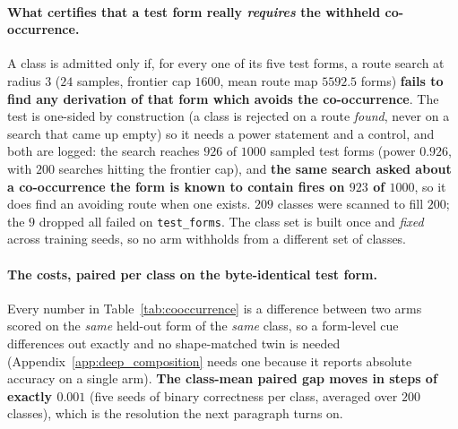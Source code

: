 \paragraph{What certifies that a test form really \emph{requires} the withheld co-occurrence.} A class is admitted only if, for every one of its five test forms, a route search at radius $3$ ($24$ samples, frontier cap $1600$, mean route map $5592.5$ forms) \textbf{fails to find any derivation of that form which avoids the co-occurrence}. The test is one-sided by construction (a class is rejected on a route \emph{found}, never on a search that came up empty) so it needs a power statement and a control, and both are logged: the search reaches $926$ of $1000$ sampled test forms (power $0.926$, with $200$ searches hitting the frontier cap), and \textbf{the same search asked about a co-occurrence the form is known to contain fires on $923$ of $1000$}, so it does find an avoiding route when one exists. $209$ classes were scanned to fill $200$; the $9$ dropped all failed on \texttt{test\_forms}. The class set is built once and \emph{fixed} across training seeds, so no arm withholds from a different set of classes.

\paragraph{The costs, paired per class on the byte-identical test form.} Every number in Table~\ref{tab:cooccurrence} is a difference between two arms scored on the \emph{same} held-out form of the \emph{same} class, so a form-level cue differences out exactly and no shape-matched twin is needed (Appendix~\ref{app:deep_composition} needs one because it reports absolute accuracy on a single arm). \textbf{The class-mean paired gap moves in steps of exactly $0.001$} (five seeds of binary correctness per class, averaged over $200$ classes), which is the resolution the next paragraph turns on.

